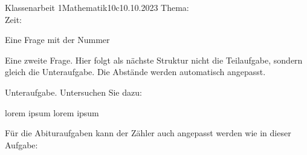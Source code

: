 \documentclass{../../exam2e}
\begin{document}

\begin{klassenarbeitskopf}{Klassenarbeit 1}{Mathematik}{10c}{10.10.2023}
	Thema:\\
	Zeit:	
\end{klassenarbeitskopf}

\begin{questions}



\begin{question}[1]
	Eine Frage mit der Nummer \thequestion
{}
\end{question}%

\question[2] Eine zweite Frage. Hier folgt als nächste Struktur nicht die Teilaufgabe, sondern gleich die Unteraufgabe. Die Abstände werden automatisch angepasst.
\begin{subparts}
		\subpart Unteraufgabe. Untersuchen Sie  dazu:
	\begin{subsubparts}
		\subsubpart lorem ipsum
		\subsubpart lorem ipsum
	\end{subsubparts}
\end{subparts}


\renewcommand{\thesubpart}{\arabic{subpart}}%
\renewcommand{\subpartlabel}{\thequestion.\thepartno.\thesubpart}%

\question[3]
Für die Abituraufgaben kann der Zähler auch angepasst werden wie in dieser Aufgabe: 




\end{questions}
\end{document}
